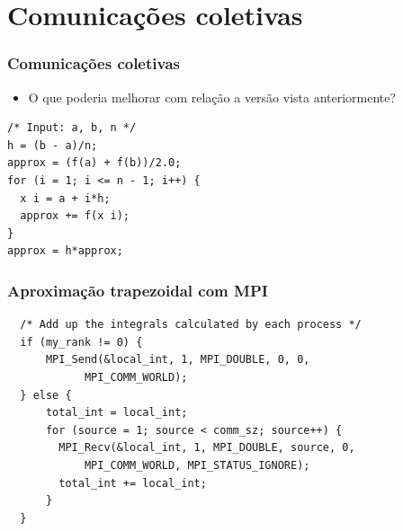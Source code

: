 \documentclass[xcolor={usenames,dvipsnames},12pt,presentation,aspectratio=169]{beamer}
\begin{document}
\section{Comunicações coletivas}
\begin{frame}[fragile]
  \frametitle{Comunicações coletivas}
  \begin{itemize}
    \item O que poderia melhorar com relação a versão vista anteriormente?
  \end{itemize}
\begin{center}
\begin{minipage}{0.95\textwidth}
  \begin{verbatim}
/* Input: a, b, n */
h = (b - a)/n;
approx = (f(a) + f(b))/2.0;
for (i = 1; i <= n - 1; i++) {
  x i = a + i*h;
  approx += f(x i);
}
approx = h*approx;
  \end{verbatim}
\end{minipage}
\end{center}
\end{frame}
\begin{frame}[fragile]
  \frametitle{Aproximação trapezoidal com MPI}
\begin{center}
\begin{minipage}{0.95\textwidth}
  \begin{verbatim}
  /* Add up the integrals calculated by each process */
  if (my_rank != 0) { 
      MPI_Send(&local_int, 1, MPI_DOUBLE, 0, 0, 
            MPI_COMM_WORLD); 
  } else {
      total_int = local_int;
      for (source = 1; source < comm_sz; source++) {
        MPI_Recv(&local_int, 1, MPI_DOUBLE, source, 0,
            MPI_COMM_WORLD, MPI_STATUS_IGNORE);
        total_int += local_int;
      }
  } 
  \end{verbatim}
\end{minipage}
\end{center}
\end{frame}
\end{document}
